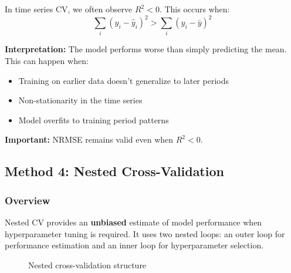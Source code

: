 \documentclass[12pt,a4paper]{article}
\begin{document}
In time series CV, we often observe $R^2 < 0$. This occurs when:
\begin{equation}
\sum_{i}(y_i - \hat{y}_i)^2 > \sum_{i}(y_i - \bar{y})^2
\end{equation}

\textbf{Interpretation:} The model performs worse than simply predicting the mean. This can happen when:
\begin{itemize}
    \item Training on earlier data doesn't generalize to later periods
    \item Non-stationarity in the time series
    \item Model overfits to training period patterns
\end{itemize}

\textbf{Important:} NRMSE remains valid even when $R^2 < 0$.

\subsection{Method 4: Nested Cross-Validation}

\subsubsection{Overview}

Nested CV provides an \textbf{unbiased} estimate of model performance when hyperparameter tuning is required. It uses two nested loops: an outer loop for performance estimation and an inner loop for hyperparameter selection.

\begin{figure}[H]
\centering
{}
\caption{Nested cross-validation structure}
\end{figure}
\end{document}
